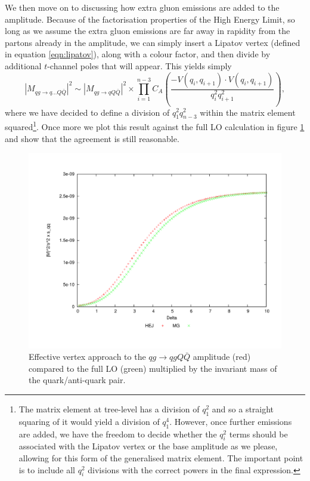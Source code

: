 We then move on to discussing how extra gluon emissions are added to the amplitude. Because of the factorisation properties of the High Energy Limit, so long as we assume the extra gluon emissions are far away in rapidity from the partons already in the amplitude, we can simply insert a Lipatov vertex (defined in equation \ref{eqn:lipatov}), along with a colour factor, and then divide by additional $t$-channel poles that will appear. This yields simply
\begin{equation}
|M_{qg \to q...Q\bar{Q}}|^2 \sim |M_{qg \to qQ\bar{Q}}|^2 \times \prod_{i=1}^{n-3}  C_A \left(\frac{-V(q_i,q_{i+1}) \cdot V(q_i,q_{i+1})}{q_i^2 q_{i+1}^2} \right),
\end{equation}
where we have decided to define a division of $q_1^2 q_{n-3}^2$ within the matrix element squared\footnote{The matrix element at tree-level has a division of $q_1^2$ and so a straight squaring of it would yield a division of $q_1^4$. However, once further emissions are added, we have the freedom to decide whether the $q_i^2$ terms should be associated with the Lipatov vertex or the base amplitude as we please, allowing for this form of the generalised matrix element. The important point is to include all $q_i^2$ divisions with the correct powers in the final expression.}. Once more we plot this result against the full LO calculation in figure \ref{fig:qg_qqq_emis} and show that the agreement is still reasonable. 

\begin{figure}[H]
\centering
\includegraphics[scale=0.45]{Images/qg_qgQQx_sqq.pdf}
\caption{Effective vertex approach to the $qg \to qgQ\bar{Q}$ amplitude (red) compared to the full LO (green) multiplied by the invariant mass of the quark/anti-quark pair.}
\label{fig:qg_qqq_emis}
\end{figure}


